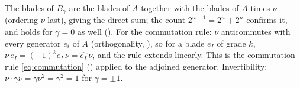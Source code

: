The blades of $B_\gamma$ are the blades of $A$ together with the blades of $A$ times $\nu$ (ordering $\nu$ last), giving the direct sum; the count $2^{n+1} = 2^n + 2^n$ confirms it, and holds for $\gamma = 0$ as well \cite{Chevalley1997} (). For the commutation rule: $\nu$ anticommutes with every generator $e_i$ of $A$ (orthogonality, ), so for a blade $e_I$ of grade $k$, $\nu\, e_I = (-1)^k e_I\, \nu = \hat{e_I}\,\nu$, and the rule extends linearly. This is the commutation rule \eqref{eq:commutation} () applied to the adjoined generator. Invertibility: $\nu \cdot \gamma\nu = \gamma \nu^2 = \gamma^2 = 1$ for $\gamma = \pm 1$.
